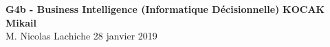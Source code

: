 \noindent
\large\textbf{G4b - Business Intelligence (Informatique Décisionnelle)} \hfill \textbf{KOCAK Mikail} \\
\normalsize M. Nicolas Lachiche \hfill 28 janvier 2019 \\[1pt]
